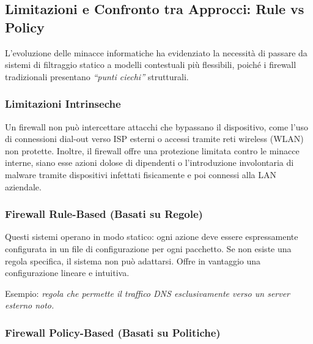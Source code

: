 \subsection{Limitazioni e Confronto tra Approcci: Rule vs Policy}

L'evoluzione delle minacce informatiche ha evidenziato la necessità di
passare da sistemi di filtraggio statico a modelli contestuali più
flessibili, poiché i firewall tradizionali presentano \textit{``punti
ciechi''} strutturali.

\subsubsection{Limitazioni Intrinseche}

Un firewall non può intercettare attacchi che bypassano il dispositivo, come l'uso di connessioni 
dial-out verso ISP esterni o accessi tramite reti wireless (WLAN) non protette. Inoltre, il firewall 
offre una protezione limitata contro le minacce interne, siano esse azioni dolose di dipendenti 
o l'introduzione involontaria di malware tramite dispositivi infettati fisicamente e poi connessi alla LAN aziendale.

\subsubsection{Firewall Rule-Based (Basati su Regole)}

Questi sistemi operano in modo statico: ogni azione deve essere espressamente configurata in 
un file di configurazione per ogni pacchetto. Se non esiste una regola specifica, il sistema non può adattarsi.
Offre in vantaggio una configurazione lineare e intuitiva.

Esempio: \textit{regola che permette il traffico DNS esclusivamente verso un server esterno noto.}

\subsubsection{Firewall Policy-Based (Basati su Politiche)}

